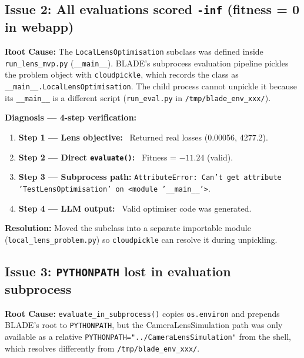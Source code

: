\documentclass[a4paper,11pt]{article}
\begin{document}
\subsection{Issue 2: All evaluations scored \texttt{-inf} (fitness = 0 in webapp)}

\textbf{Root Cause:} The \texttt{LocalLensOptimisation} subclass was defined
inside \texttt{run\_lens\_mvp.py} (\texttt{\_\_main\_\_}). BLADE's subprocess
evaluation pipeline pickles the problem object with \texttt{cloudpickle},
which records the class as \texttt{\_\_main\_\_.LocalLensOptimisation}. The
child process cannot unpickle it because its \texttt{\_\_main\_\_} is a
different script (\texttt{run\_eval.py} in \texttt{/tmp/blade\_env\_xxx/}).

\textbf{Diagnosis — 4-step verification:}
\begin{enumerate}
    \item \textbf{Step 1 — Lens objective:} \checkmark\ Returned real losses
          (0.00056, 4277.2).
    \item \textbf{Step 2 — Direct \texttt{evaluate()}:} \checkmark\ Fitness =
          $-11.24$ (valid).
    \item \textbf{Step 3 — Subprocess path:} 
          \texttt{AttributeError: Can't get attribute 'TestLensOptimisation'
          on <module '\_\_main\_\_'>}.
    \item \textbf{Step 4 — LLM output:} \checkmark\ Valid optimiser code was
          generated.
\end{enumerate}

\textbf{Resolution:} Moved the subclass into a separate importable module
(\texttt{local\_lens\_problem.py}) so \texttt{cloudpickle} can resolve it
during unpickling.

\subsection{Issue 3: \texttt{PYTHONPATH} lost in evaluation subprocess}

\textbf{Root Cause:} \texttt{evaluate\_in\_subprocess()} copies
\texttt{os.environ} and prepends BLADE's root to \texttt{PYTHONPATH}, but the
CameraLensSimulation path was only available as a relative
\texttt{PYTHONPATH="../CameraLensSimulation"} from the shell, which resolves
differently from \texttt{/tmp/blade\_env\_xxx/}.
\end{document}
